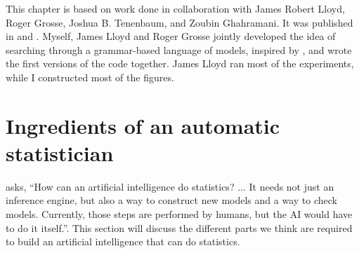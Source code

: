 
This chapter is based on work done in collaboration with James Robert Lloyd, Roger Grosse, Joshua B. Tenenbaum, and Zoubin Ghahramani.
It was published in \citet{DuvLloGroetal13} and \citet{LloDuvGroetal14}.
Myself, James Lloyd and Roger Grosse jointly developed the idea of searching through a grammar-based language of \gp{} models, inspired by \citet{grosse2012exploiting}, and wrote the first versions of the code together.
James Lloyd ran most of the experiments, while I constructed most of the figures.







\section{Ingredients of an automatic statistician}
\label{sec:ingredients}
\citet{gelman2013philblogpost} asks, ``How can an artificial intelligence do statistics? ... It needs not just an inference engine, but also a way to construct new models and a way to check models. Currently, those steps are performed by humans, but the AI would have to do it itself.''.
%
This section will discuss the different parts we think are required to build an artificial intelligence that can do statistics.

